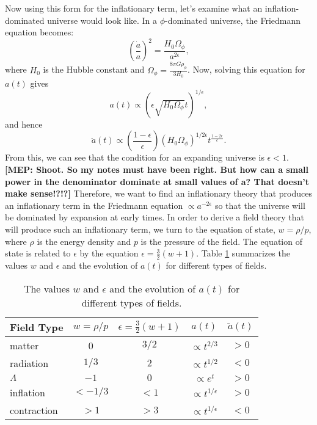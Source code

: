 \documentclass[onecolumn,apj]{emulateapj}
\newcommand{\mep}[1]{{\color{applegreen} \textbf{[MEP:  #1]}}}
\begin{document}
Now using this form for the inflationary term, let's examine what an inflation-dominated universe would look like. In a $\phi$-dominated universe, the Friedmann equation becomes:
\begin{equation}
\left ( \frac{\dot a}{a} \right ) ^2 = \frac{H_0 \Omega_\phi}{a^{2\epsilon}},
\end{equation}
where $H_0$ is the Hubble constant and $\Omega_\phi = \tfrac{8\pi G \rho_\phi}{3 H_0}$. Now, solving this equation for $a(t)$ gives
\begin{equation}
a(t) \propto (\epsilon \sqrt{H_0 \Omega_\phi} t)^{1/\epsilon},
\end{equation}
and hence 
\begin{equation}
\ddot a(t) \propto \left ( \frac{1-\epsilon}{\epsilon} \right ) (H_0 \Omega_\phi)^{1/2\epsilon} t^{\tfrac{1-2\epsilon}{\epsilon}}. 
\end{equation}
From this, we can see that the condition for an expanding universe is $\epsilon<1$. \mep{Shoot. So my notes must have been right. But how can a small power in the denominator dominate at small values of a? That doesn't make sense!?!?} Therefore, we want to find an inflationary theory that produces an inflationary term in the Friedmann equation $\propto a^{-2\epsilon}$ so that the universe will be dominated by expansion at early times. In order to derive a field theory that will produce such an inflationary term, we turn to the equation of state, $w=\rho/p$, where $\rho$ is the energy density and $p$ is the pressure of the field. The equation of state is related to $\epsilon$ by the equation $\epsilon = \tfrac{3}{2}(w+1)$. Table \ref{tab:field_scenarios} summarizes the values $w$ and $\epsilon$ and the evolution of $a(t)$ for different types of fields. 

\begin{table}[htbp]
   \centering
   \begin{tabular}{@{} lcccc @{}} %
      \toprule
      Field Type & $w=\rho/p$ &  $\epsilon=\tfrac{3}{2}(w+1)$ & $a(t)$ & $\ddot a(t)$ \\
      \midrule
      matter & 0 & $3/2$ & $\propto t^{2/3}$ & $>0$ \\
       radiation & $1/3$ & $2$ & $\propto t^{1/2}$ & $<0$ \\
       $\Lambda$ & $-1$ & $0$ & $\propto e^t$ & $>0$ \\
       inflation & $<-1/3$ & $<1$ & $\propto t^{1/\epsilon}$ & $>0$ \\
       contraction & $>1$ & $>3$ & $\propto t^{1/\epsilon}$ & $<0$ \\
      \bottomrule
   \end{tabular}
   \caption{The values $w$ and $\epsilon$ and the evolution of $a(t)$ for different types of fields.}
   \label{tab:field_scenarios}
\end{table}
\end{document}
